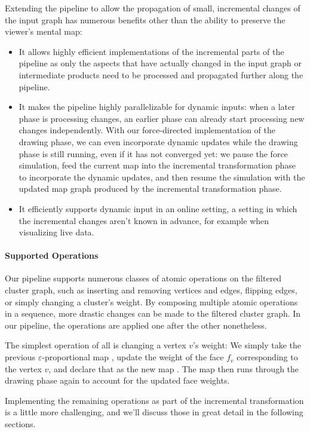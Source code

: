 Extending the pipeline to allow the propagation of small, incremental changes of the input graph has numerous benefits other than the ability to preserve the viewer's mental map:
%
\begin{itemize}
\item It allows highly efficient implementations of the incremental parts of the pipeline as only the aspects that have actually changed in the input graph or intermediate products need to be processed and propagated further along the pipeline.
\item It makes the pipeline highly parallelizable for dynamic inputs: when a later phase is processing changes, an earlier phase can already start processing new changes independently.
With our force-directed implementation of the drawing phase, we can even incorporate dynamic updates while the drawing phase is still running, even if it has not converged yet: we pause the force simulation, feed the current map  into the incremental transformation phase to incorporate the dynamic updates, and then resume the simulation with the updated map graph  produced by the incremental transformation phase.
\item It efficiently supports dynamic input in an online setting, \ie{} a setting in which the incremental changes aren't known in advance, for example when visualizing live data.
\end{itemize}



\paragraph{Supported Operations}

Our pipeline supports numerous classes of atomic operations on the filtered cluster graph, such as inserting and removing vertices and edges, flipping edges, or simply changing a cluster's weight.
By composing multiple atomic operations in a sequence, more drastic changes can be made to the filtered cluster graph.
In our pipeline, the operations are applied one after the other nonetheless.

The simplest operation of all is changing a vertex $v$'s weight:
We simply take the previous $\varepsilon$-proportional map , update the weight of the face $f_v$ corresponding to the vertex $v$, and declare that as the new map .
The map  then runs through the drawing phase again to account for the updated face weights.

Implementing the remaining operations as part of the incremental transformation is a little more challenging, and we'll discuss those in great detail in the following sections.

\clearpage

\clearpage

\clearpage

